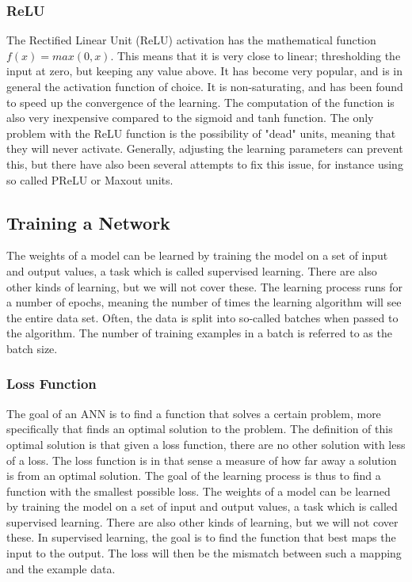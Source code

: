 \subsubsection{ReLU}

The Rectified Linear Unit (ReLU) activation has the mathematical function $f(x) = max(0,x)$. This means that it is very close to linear; thresholding the input at zero, but keeping any value above. It has become very popular, and is in general the activation function of choice. It is non-saturating, and has been found to speed up the convergence of the learning. The computation of the function is also very inexpensive compared to the sigmoid and tanh function. The only problem with the ReLU function is the possibility of "dead" units, meaning that they will never activate. Generally, adjusting the learning parameters can prevent this, but there have also been several attempts to fix this issue, for instance using so called PReLU or Maxout units.

\subsection{Training a Network}

The weights of a model can be learned by training the model on a set of input and output values, a task which is called supervised learning. There are also other kinds of learning, but we will not cover these. The learning process runs for a number of epochs, meaning the number of times the learning algorithm will see the entire data set. Often, the data is split into so-called batches when passed to the algorithm. The number of training examples in a batch is referred to as the batch size.

\subsubsection{Loss Function}

\noindent The goal of an ANN is to find a function that solves a certain problem, more specifically that finds an optimal solution to the problem. The definition of this optimal solution is that given a loss function, there are no other solution with less of a loss. The loss function is in that sense a measure of how far away a solution is from an optimal solution. The goal of the learning process is thus to find a function with the smallest possible loss. The weights of a model can be learned by training the model on a set of input and output values, a task which is called supervised learning. There are also other kinds of learning, but we will not cover these. In supervised learning, the goal is to find the function that best maps the input to the output. The loss will then be the mismatch between such a mapping and the example data.

